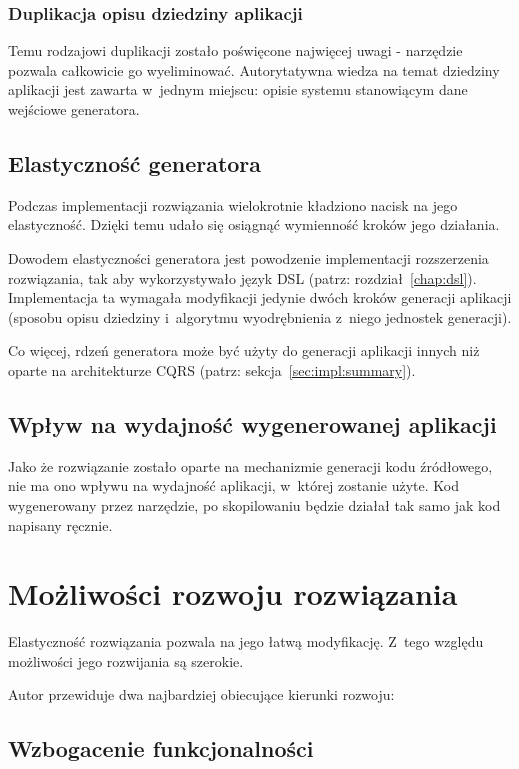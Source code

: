 \subsubsection{Duplikacja opisu dziedziny aplikacji}
Temu rodzajowi duplikacji zostało poświęcone najwięcej uwagi - narzędzie pozwala całkowicie go wyeliminować.
Autorytatywna wiedza na temat dziedziny aplikacji jest zawarta w~jednym miejscu: opisie systemu stanowiącym dane wejściowe generatora.


\subsection{Elastyczność generatora}

Podczas implementacji rozwiązania wielokrotnie kładziono nacisk na jego elastyczność.
Dzięki temu udało się osiągnąć wymienność kroków jego działania.

Dowodem elastyczności generatora jest powodzenie implementacji rozszerzenia rozwiązania, tak aby wykorzystywało język DSL (patrz: rozdział~\ref{chap:dsl}).
Implementacja ta wymagała modyfikacji jedynie dwóch kroków generacji aplikacji (sposobu opisu dziedziny i~algorytmu wyodrębnienia z~niego jednostek generacji).

Co więcej, rdzeń generatora może być użyty do generacji aplikacji innych niż oparte na architekturze CQRS (patrz: sekcja~\ref{sec:impl:summary}).


\subsection{Wpływ na wydajność wygenerowanej aplikacji}

Jako że rozwiązanie zostało oparte na mechanizmie generacji kodu źródłowego, nie ma ono wpływu na wydajność aplikacji, w~której zostanie użyte.
Kod wygenerowany przez narzędzie, po skopilowaniu będzie działał tak samo jak kod napisany ręcznie.



\section{Możliwości rozwoju rozwiązania}

Elastyczność rozwiązania pozwala na jego łatwą modyfikację.
Z~tego względu możliwości jego rozwijania są szerokie.

Autor przewiduje dwa najbardziej obiecujące kierunki rozwoju:


\subsection{Wzbogacenie funkcjonalności}

